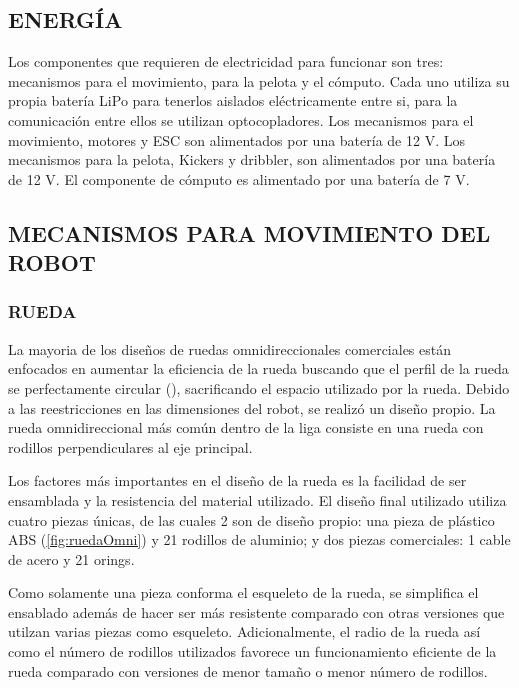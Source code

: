 \documentclass[twocolumn,10pt]{amrob}
\begin{document}
\subsection*{ENERGÍA}
Los componentes que requieren de electricidad para funcionar son tres: mecanismos para el movimiento, para la pelota y el cómputo. Cada uno utiliza su propia batería LiPo para tenerlos aislados eléctricamente entre si, para la comunicación entre ellos se utilizan optocopladores. Los mecanismos para el movimiento, motores y ESC son alimentados por una batería de 12 V. Los mecanismos para la pelota, Kickers y dribbler, son alimentados por una batería de 12 V. El componente de cómputo es alimentado por una batería de 7 V.
\subsection*{MECANISMOS PARA MOVIMIENTO DEL ROBOT}

\subsubsection*{RUEDA}
La mayoria de los diseños de ruedas omnidireccionales comerciales están enfocados en aumentar la eficiencia de la rueda buscando que el perfil de la rueda se perfectamente circular (\cite{rojasHist}), sacrificando el espacio utilizado por la rueda. Debido a las reestricciones en las dimensiones del robot, se realizó un diseño propio. La rueda omnidireccional más común dentro de la liga consiste en una rueda con rodillos perpendiculares al eje principal. \par

Los factores más importantes en el diseño de la rueda es la facilidad de ser ensamblada y la resistencia del material utilizado. El diseño final utilizado utiliza cuatro piezas únicas, de las cuales 2 son de diseño propio: una pieza de plástico ABS (\ref{fig:ruedaOmni}) y 21 rodillos de aluminio; y dos piezas comerciales: 1 cable de acero y 21 orings. \par

Como solamente una pieza conforma el esqueleto de la rueda, se simplifica el ensablado además de hacer ser más resistente comparado con otras versiones que utilzan varias piezas como esqueleto. Adicionalmente, el radio de la rueda así como el número de rodillos utilizados favorece un funcionamiento eficiente de la rueda comparado con versiones de menor tamaño o menor número de rodillos.\par
\end{document}

